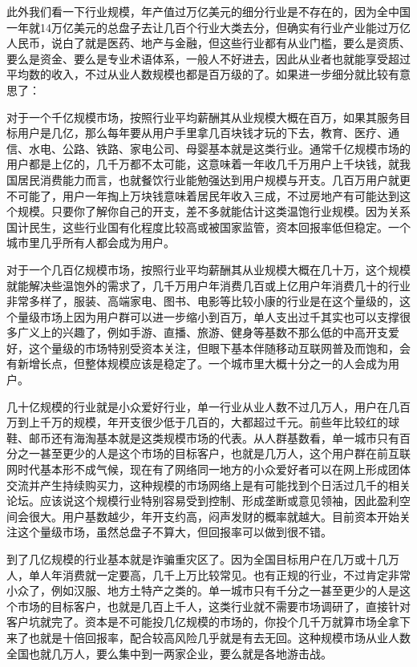 \documentclass[]{tufte-book}
\begin{document}
此外我们看一下行业规模，年产值过万亿美元的细分行业是不存在的，因为全中国一年就14万亿美元的总盘子去让几百个行业大类去分，但确实有行业产业能过万亿人民币，说白了就是医药、地产与金融，但这些行业都有从业门槛，要么是资质、要么是资金、要么是专业术语体系，一般人不好进去，因此从业者也就能享受超过平均数的收入，不过从业人数规模也都是百万级的了。如果进一步细分就比较有意思了：

对于一个千亿规模市场，按照行业平均薪酬其从业规模大概在百万，如果其服务目标用户是几亿，那么每年要从用户手里拿几百块钱才玩的下去，教育、医疗、通信、水电、公路、铁路、家电公司、母婴基本就是这类行业。通常千亿规模市场的用户都是上亿的，几千万都不太可能，这意味着一年收几千万用户上千块钱，就我国居民消费能力而言，也就餐饮行业能勉强达到用户规模与开支。几百万用户就更不可能了，用户一年掏上万块钱意味着居民年收入三成，不过房地产有可能达到这个规模。只要你了解你自己的开支，差不多就能估计这类温饱行业规模。因为关系国计民生，这些行业国有化程度比较高或被国家监管，资本回报率低但稳定。一个城市里几乎所有人都会成为用户。

对于一个几百亿规模市场，按照行业平均薪酬其从业规模大概在几十万，这个规模就能解决些温饱外的需求了，几千万用户年消费几百或上亿用户年消费几十的行业非常多样了，服装、高端家电、图书、电影等比较小康的行业是在这个量级的，这个量级市场上因为用户群可以进一步缩小到百万，单人支出过千其实也可以支撑很多广义上的兴趣了，例如手游、直播、旅游、健身等基数不那么低的中高开支爱好，这个量级的市场特别受资本关注，但眼下基本伴随移动互联网普及而饱和，会有新增长点，但整体规模应该是稳定了。一个城市里大概十分之一的人会成为用户。

几十亿规模的行业就是小众爱好行业，单一行业从业人数不过几万人，用户在几百万到上千万的规模，年开支很少低于几百的，大都超过千元。前些年比较红的球鞋、邮币还有海淘基本就是这类规模市场的代表。从人群基数看，单一城市只有百分之一甚至更少的人是这个市场的目标客户，也就是几万人，这个用户群在前互联网时代基本形不成气候，现在有了网络同一地方的小众爱好者可以在网上形成团体交流并产生持续购买力，这种规模的市场网络上是有可能找到个日活过几千的相关论坛。应该说这个规模行业特别容易受到控制、形成垄断或意见领袖，因此盈利空间会很大。用户基数越少，年开支约高，闷声发财的概率就越大。目前资本开始关注这个量级市场，虽然总盘子不算大，但回报率可以做到很不错。

到了几亿规模的行业基本就是诈骗重灾区了。因为全国目标用户在几万或十几万人，单人年消费就一定要高，几千上万比较常见。也有正规的行业，不过肯定非常小众了，例如汉服、地方土特产之类的。单一城市只有千分之一甚至更少的人是这个市场的目标客户，也就是几百上千人，这类行业就不需要市场调研了，直接针对客户坑就完了。资本是不可能投几亿规模的市场的，你投个几千万就算市场全拿下来了也就是十倍回报率，配合较高风险几乎就是有去无回。这种规模市场从业人数全国也就几万人，要么集中到一两家企业，要么就是各地游击战。
\end{document}
